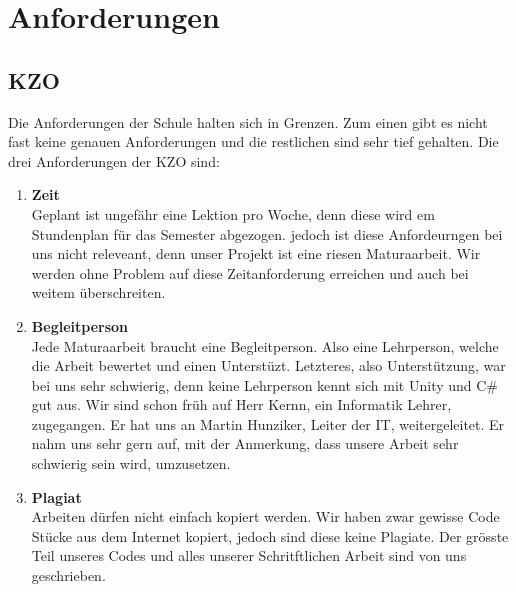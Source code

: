 \chapter{Anforderungen}

\section{KZO}
Die Anforderungen der Schule halten sich in Grenzen. Zum einen gibt es nicht fast keine
genauen Anforderungen und die restlichen sind sehr tief gehalten. Die drei Anforderungen der KZO sind:
\begin{enumerate}
    \item \textbf{Zeit} \\
        Geplant ist ungefähr eine Lektion pro Woche, denn diese wird em Stundenplan für das Semester abgezogen.
        jedoch ist diese Anfordeurngen bei uns nicht releveant, denn unser Projekt ist eine riesen Maturaarbeit.
        Wir werden ohne Problem auf diese Zeitanforderung erreichen und auch bei weitem überschreiten.
    \item \textbf{Begleitperson} \\
        Jede Maturaarbeit braucht eine Begleitperson. Also eine Lehrperson, welche die Arbeit bewertet und einen Unterstüzt.
        Letzteres, also Unterstützung, war bei uns sehr schwierig, denn keine Lehrperson kennt sich mit Unity und C\# gut aus.
        Wir sind schon früh auf Herr Kernn, ein Informatik Lehrer, zugegangen.
        Er hat uns an Martin Hunziker, Leiter der IT, weitergeleitet. Er nahm uns sehr gern auf, mit der Anmerkung, dass unsere Arbeit sehr schwierig sein wird, umzusetzen.
    \item \textbf{Plagiat} \\
        Arbeiten dürfen nicht einfach kopiert werden. Wir haben zwar gewisse Code Stücke aus dem Internet kopiert, jedoch sind diese keine Plagiate.
        Der grösste Teil unseres Codes und alles unserer Schritftlichen Arbeit sind von uns geschrieben.
\end{enumerate}

